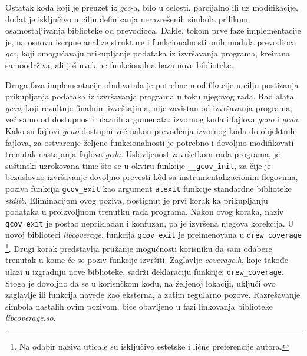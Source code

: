 \documentclass[12pt,oneside]{memoir}
\newcommand{\kod}[1]{\texttt{#1}}
\newcommand{\strano}[1]{\textit{#1}}
\begin{document}
Ostatak koda koji je preuzet iz \strano{gcc}-a, bilo u celosti, parcijalno ili uz modifikacije, dodat je isključivo u cilju definisanja nerazrešenih simbola prilikom osamostaljivanja biblioteke od prevodioca. Dakle, tokom prve faze implementacije je, na osnovu iscrpne analize strukture i funkcionalnosti onih modula prevodioca \strano{gcc}, koji omogućavaju prikupljanje podataka iz izvršavanja programa, kreirana samoodrživa, ali još uvek ne funkcionalna baza nove biblioteke. 

Druga faza implementacije obuhvatala je potrebne modifikacije u cilju postizanja prikupljanja podataka iz izvršavanja programa u toku njegovog rada. Rad alata \strano{gcov}, koji rezultuje finalnim izveštajima, nije zavistan od izvršavanja programa, već samo od dostupnosti ulaznih argumenata: izvornog koda i fajlova \strano{gcno} i \strano{gcda}. Kako su fajlovi \strano{gcno} dostupni već nakon prevođenja izvornog koda do objektnih fajlova, za ostvarenje željene funkcionalnosti je potrebno i dovoljno modifikovati trenutak nastajanja fajlova \strano{gcda}. Uslovljenost završetkom rada programa, je suštinski uzrokovana time što se u okviru funkcije \kod{\_\_gcov\_init}, za čije je bezuslovno izvršavanje dovoljno prevesti k\^{o}d sa instrumentalizacionim flegovima, poziva funkcija \kod{gcov\_exit} kao argument \kod{atexit} funkcije standardne biblioteke \strano{stdlib}. Eliminacijom ovog poziva, postignut je prvi korak ka prikupljanju podataka u proizvoljnom trenutku rada programa. Nakon ovog koraka, naziv \kod{gcov\_exit} je postao neprikladan i konfuzan, pa je izvršena njegova korekcija. U novoj biblioteci \strano{libcoverage}, funkcija \kod{gcov\_exit} je preimenovana u \kod{drew\_coverage} \footnote{Na odabir naziva uticale su isključivo estetske i lične preferencije autora.}. Drugi korak predstavlja pružanje mogućnosti korisniku da sam odabere trenutak u kome će se poziv funkcije izvršiti. Zaglavlje \strano{coverage.h}, koje takođe ulazi u izgradnju nove biblioteke, sadrži deklaraciju funkcije: \kod{drew\_coverage}. Stoga je dovoljno da se u korisnčkom kodu, na željenoj lokaciji, uključi ovo zaglavlje ili funkcija navede kao eksterna, a zatim regularno pozove. Razrešavanje simbola nastalih ovim pozivom, biće obavljeno u fazi linkovanja biblioteke \strano{libcoverage.so}.
\end{document}
